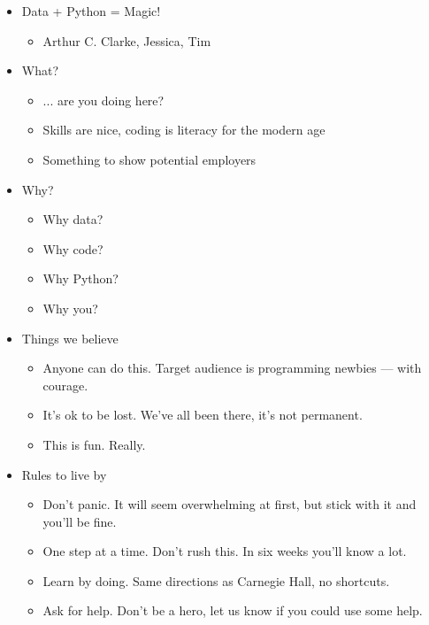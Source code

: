 \documentclass[11pt]{article}
\begin{document}
\begin{itemize}
\item Data + Python = Magic!
\begin{itemize}
\item Arthur C. Clarke, Jessica, Tim
\end{itemize}

\item What?
\begin{itemize}
\item ... are you doing here?
\item Skills are nice, coding is literacy for the modern age
\item Something to show potential employers
\end{itemize}

\item Why?
\begin{itemize}
\item Why data?
\item Why code?
\item Why Python?
\item Why you?
\end{itemize}

\item Things we believe
\begin{itemize}
\item Anyone can do this.  Target audience is {programming newbies --- with courage}.
\item It's ok to be lost.  We've all been there, it's not permanent.
\item This is fun.  Really.
\end{itemize}


\item Rules to live by
\begin{itemize}
\item Don't panic.  It will seem overwhelming at first, but stick with it and you'll be fine.
\item One step at a time.  Don't rush this.  In six weeks you'll know a lot.
\item Learn by doing.  Same directions as Carnegie Hall, no shortcuts.
\item Ask for help.  Don't be a hero, let us know if you could use some help.
\end{itemize}


\end{itemize}
\end{document}
